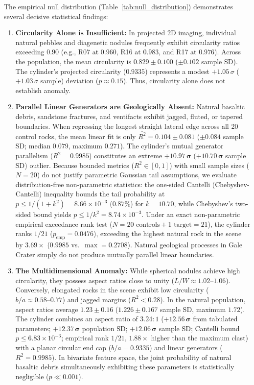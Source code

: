 \documentclass[11pt,a4paper]{article}
\begin{document}
The empirical null distribution (Table~\ref{tab:null_distribution}) demonstrates several decisive statistical findings:
\begin{enumerate}
	\item \textbf{Circularity Alone is Insufficient:} In projected 2D imaging, individual natural pebbles and diagenetic nodules frequently exhibit circularity ratios exceeding $0.90$ (e.g., R07 at $0.960$, R16 at $0.983$, and R17 at $0.976$). Across the population, the mean circularity is $0.829 \pm 0.100$ ($\pm 0.102$ sample SD). The cylinder's projected circularity ($0.9335$) represents a modest $+1.05\,\sigma$ ($+1.03\,\sigma$ sample) deviation ($p \approx 0.15$). Thus, circularity alone does not establish anomaly.
	\item \textbf{Parallel Linear Generators are Geologically Absent:} Natural basaltic debris, sandstone fractures, and ventifacts exhibit jagged, fluted, or tapered boundaries. When regressing the longest straight lateral edge across all 20 control rocks, the mean linear fit is only $\overline{R^2} = 0.104 \pm 0.081$ ($\pm 0.084$ sample SD; median $0.079$, maximum $0.271$). The cylinder's mutual generator parallelism ($R^2 = 0.9985$) constitutes an extreme $\mathbf{+10.97\,\sigma}$ ($\mathbf{+10.70\,\sigma}$ sample SD) outlier. Because bounded metrics ($R^2 \in [0, 1]$) with small sample sizes ($N = 20$) do not justify parametric Gaussian tail assumptions, we evaluate distribution-free non-parametric statistics: the one-sided Cantelli (Chebyshev-Cantelli) inequality bounds the tail probability at $p \le 1/(1+k^2) = 8.66 \times 10^{-3}$ ($0.87\%$) for $k = 10.70$, while Chebyshev's two-sided bound yields $p \le 1/k^2 = 8.74 \times 10^{-3}$. Under an exact non-parametric empirical exceedance rank test ($N = 20\text{ controls} + 1\text{ target} = 21$), the cylinder ranks $1/21$ ($p_{\text{emp}} = 0.0476$), exceeding the highest natural rock in the scene by $3.69\times$ ($0.9985$ vs.\ $\max = 0.2708$). Natural geological processes in Gale Crater simply do not produce mutually parallel linear boundaries.
	\item \textbf{The Multidimensional Anomaly:} While spherical nodules achieve high circularity, they possess aspect ratios close to unity ($L/W \approx 1.02\text{--}1.06$). Conversely, elongated rocks in the scene exhibit low circularity ($b/a \approx 0.58\text{--}0.77$) and jagged margins ($R^2 < 0.28$). In the natural population, aspect ratios average $1.23 \pm 0.16$ ($1.226 \pm 0.167$ sample SD, maximum $1.72$). The cylinder combines an aspect ratio of $3.24:1$ ($\mathbf{+12.56\,\sigma}$ from tabulated parameters; $\mathbf{+12.37\,\sigma}$ population SD; $\mathbf{+12.06\,\sigma}$ sample SD; Cantelli bound $p \le 6.83 \times 10^{-3}$; empirical rank $1/21$, $1.88\times$ higher than the maximum clast) with a planar circular end cap ($b/a = 0.9335$) and linear generators ($R^2 = 0.9985$). In bivariate feature space, the joint probability of natural basaltic debris simultaneously exhibiting these parameters is statistically negligible ($p \ll 0.001$).
\end{enumerate}
\end{document}
